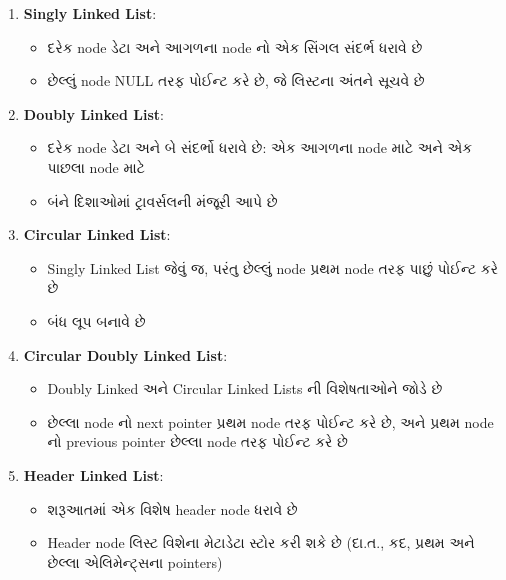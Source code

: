 \begin{enumerate}
\def\labelenumi{\arabic{enumi}.}
\tightlist
\item
  \textbf{Singly Linked List}:

  \begin{itemize}
  \tightlist
  \item
    દરેક node ડેટા અને આગળના node નો એક સિંગલ સંદર્ભ ધરાવે છે
  \item
    છેલ્લું node NULL તરફ પોઈન્ટ કરે છે, જે લિસ્ટના અંતને સૂચવે છે
  \end{itemize}
\item
  \textbf{Doubly Linked List}:

  \begin{itemize}
  \tightlist
  \item
    દરેક node ડેટા અને બે સંદર્ભો ધરાવે છે: એક આગળના node માટે અને એક પાછલા node
    માટે
  \item
    બંને દિશાઓમાં ટ્રાવર્સલની મંજૂરી આપે છે
  \end{itemize}
\item
  \textbf{Circular Linked List}:

  \begin{itemize}
  \tightlist
  \item
    Singly Linked List જેવું જ, પરંતુ છેલ્લું node પ્રથમ node તરફ પાછું પોઈન્ટ કરે છે
  \item
    બંધ લૂપ બનાવે છે
  \end{itemize}
\item
  \textbf{Circular Doubly Linked List}:

  \begin{itemize}
  \tightlist
  \item
    Doubly Linked અને Circular Linked Lists ની વિશેષતાઓને જોડે છે
  \item
    છેલ્લા node નો next pointer પ્રથમ node તરફ પોઈન્ટ કરે છે, અને પ્રથમ node નો
    previous pointer છેલ્લા node તરફ પોઈન્ટ કરે છે
  \end{itemize}
\item
  \textbf{Header Linked List}:

  \begin{itemize}
  \tightlist
  \item
    શરૂઆતમાં એક વિશેષ header node ધરાવે છે
  \item
    Header node લિસ્ટ વિશેના મેટાડેટા સ્ટોર કરી શકે છે (દા.ત., કદ, પ્રથમ અને છેલ્લા
    એલિમેન્ટ્સના pointers)
  \end{itemize}
\end{enumerate}

